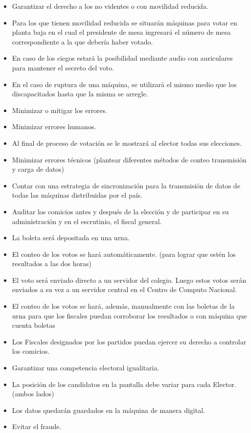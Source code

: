 \documentclass[spanish, 10pt,a4paper]{article}
\numberwithin{equation}{section} %
\begin{document}
\begin{itemize}
\item Garantizar el derecho a los no videntes o con movilidad reducida. 
\item Para los que tienen movilidad reducida se situarán máquinas para votar en planta baja en el cual el presidente de mesa ingresará el número de mesa correspondiente a la que debería haber votado.
\item En caso de los ciegos estará la posibilidad mediante audio con auriculares para mantener el secreto del voto.
\item En el caso de ruptura de una máquina, se utilizará el mismo medio que los discapacitados hasta que la misma se arregle.
\item Minimizar o mitigar los errores.
\item Minimizar errores humanos.
\item Al final de proceso de votación se le mostrará al elector todas sus elecciones.
\item Minimizar errores técnicos (plantear diferentes métodos de conteo transmisión y carga de datos)
\item Contar con una estrategia de sincronización para la transmisión de datos de todas las máquinas distribuidas por el país.
\item Auditar los comicios antes y después de la elección y de participar en su administración y en el escrutinio, el fiscal general.
\item La boleta será depositada en una urna. 
\item El conteo de los votos se hará automáticamente. (para lograr que estén los resultados a las dos horas)
\item El voto será enviado directo a un servidor del colegio. Luego estos votos serán enviados a su vez a un servidor central en el Centro de Computo Nacional. 
\item El conteo de los votos se hará, además, manualmente con las boletas de la urna para que los fiscales puedan corroborar los resultados o con máquina que cuenta boletas
\item Los Fiscales designados por los partidos puedan ejercer su derecho a controlar los comicios.
\item Garantizar una competencia electoral igualitaria.
\item La posición de los candidatos en la pantalla debe variar para cada Elector. (ambos lados)
\item Los datos quedarán guardados en la máquina de manera digital.
\item Evitar el fraude.

\end{itemize}
\end{document}
